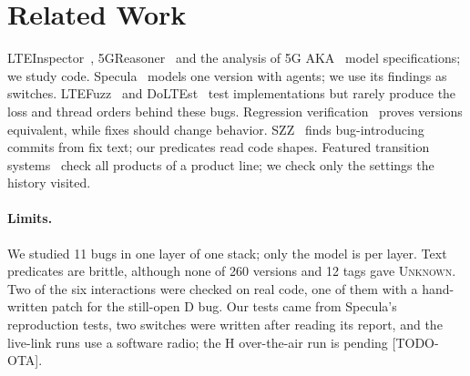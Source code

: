 \documentclass[sigconf,10pt]{acmart}
\newcommand{\sw}[1]{\textsf{\small #1}}
\begin{document}
\section{Related Work}
\label{sec:related}
LTEInspector~\cite{hussain2018lteinspector},
5GReasoner~\cite{hussain20195greasoner} and the analysis of 5G
AKA~\cite{basin2018formal} model specifications; we study code.
Specula~\cite{cheng2026specula} models one version with agents; we use
its findings as switches. LTEFuzz~\cite{kim2019touching} and
DoLTEst~\cite{park2022doltest} test implementations but rarely produce
the loss and thread orders behind these bugs. Regression
verification~\cite{godlin2009regression} proves versions equivalent,
while fixes should change behavior. SZZ~\cite{sliwerski2005changes} finds
bug-introducing commits from fix text; our predicates read code shapes.
Featured transition systems~\cite{classen2010model} check all products of
a product line; we check only the settings the history visited.

\paragraph{Limits.}
We studied 11 bugs in one layer of one stack; only the model is per
layer. Text predicates are brittle, although none of 260 versions and 12
tags gave \textsc{Unknown}. Two of the six interactions were checked
on real code, one of them with a hand-written patch for the still-open
\sw{D} bug. Our tests came from Specula's reproduction tests, two
switches were written after reading its report, and the live-link runs
use a software radio; the H over-the-air run is pending [TODO-OTA].



\end{document}
